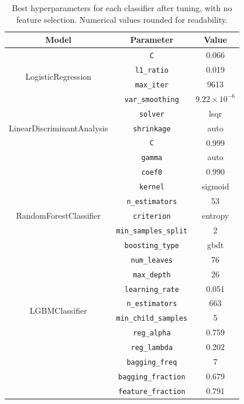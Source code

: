 \documentclass[12pt]{article}
\begin{document}
\begin{table}[H]
    \centering
    \begin{tabular}{|c|c|c|}
    \hline
    \textbf{Model} & \textbf{Parameter} & \textbf{Value} \\
    \hline
    \multirow{4}{*}{LogisticRegression}
      & \texttt{C} & 0.066 \\
      & \texttt{l1\_ratio} & 0.019 \\
      & \texttt{max\_iter} & 9613 \\
    \hline
    \multirow{1}{*}{GaussianNB}
      & \texttt{var\_smoothing} & $9.22 \times 10^{-6}$ \\
    \hline
    \multirow{3}{*}{LinearDiscriminantAnalysis}
      & \texttt{solver} & lsqr \\
      & \texttt{shrinkage} & auto \\
    \hline
    \multirow{5}{*}{SVC}
      & \texttt{C} & 0.999 \\
      & \texttt{gamma} & auto \\
      & \texttt{coef0} & 0.990 \\
      & \texttt{kernel} & sigmoid \\
    \hline
    \multirow{3}{*}{RandomForestClassifier}
      & \texttt{n\_estimators} & 53 \\
      & \texttt{criterion} & entropy \\
      & \texttt{min\_samples\_split} & 2 \\
    \hline
    \multirow{10}{*}{LGBMClassifier}
      & \texttt{boosting\_type} & gbdt \\
      & \texttt{num\_leaves} & 76 \\
      & \texttt{max\_depth} & 26 \\
      & \texttt{learning\_rate} & 0.051 \\
      & \texttt{n\_estimators} & 663 \\
      & \texttt{min\_child\_samples} & 5 \\
      & \texttt{reg\_alpha} & 0.759 \\
      & \texttt{reg\_lambda} & 0.202 \\
      & \texttt{bagging\_freq} & 7 \\
      & \texttt{bagging\_fraction} & 0.679 \\
      & \texttt{feature\_fraction} & 0.791 \\
    \hline
    \end{tabular}
    \caption{Best hyperparameters for each classifier after tuning, with no
    feature selection. Numerical values rounded for readability.}
    \label{tab:hyperparams_models}
\end{table}
\end{document}
